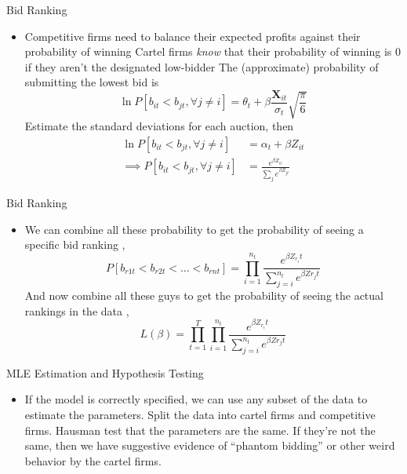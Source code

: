 \documentclass[dvipsnames]{beamer}
\begin{document}
%
\begin{frame}{Bid Ranking}
  \begin{itemize}
  \item Competitive firms need to balance their expected profits against their probability of winning
    \vitem Cartel firms \emph{know} that their probability of winning is $0$ if they aren't the designated low-bidder
    \vitem The (approximate) probability of submitting the lowest bid is
    \[
\ln P[b_{it} < b_{jt}, \forall j \ne i] = \theta_t + \beta \frac{\mathbf{X}_{it}}{\sigma_t} \sqrt{\frac{\pi}{6}} \tag{MNL }
    \]
    \vitem Estimate the standard deviations for each auction, then
    \begin{align*}
      \ln P [b_{it} < b_{jt}, \forall j \ne i] &= \alpha_t + \beta Z_{it}\\
      \implies P [b_{it} < b_{jt}, \forall j \ne i] &= \frac{e^{\beta Z_{it}}}{\sum_je^{\beta Z_{jt}}}
                                           \end{align*}
  \end{itemize}
\end{frame}
%
\begin{frame}{Bid Ranking}
  \begin{itemize}
  \item We can combine all these probability to get the probability of seeing a specific bid ranking ,
    \[
P[b_{r1t} < b_{r2t} < \ldots < b_{rnt}] = \prod^{n_t}_{i = 1} \frac{e^{\beta Z_{r_i}t}}{\sum^{n_t}_{j = i} e^{\beta Z r_j t}}
    \]
    \vitem And now combine all these guys to get the probability of seeing the actual rankings in the data ,
    \[
L(\beta) = \prod^T_{t = 1} \prod^{n_t}_{i = 1} \frac{e^{\beta Z_{r_i}t}}{\sum^{n_t}_{j = i} e^{\beta Z r_j t}}
    \]
  \end{itemize}
\end{frame}
%
\begin{frame}{MLE Estimation and Hypothesis Testing}
  \begin{itemize}
  \item If the model is correctly specified, we can use any subset of the data to estimate the parameters.
    \vitem Split the data into cartel firms and competitive firms.
    \vitem Hausman test that the parameters are the same.
    \vitem If they're not the same, then we have suggestive evidence of ``phantom bidding'' or other weird behavior by the cartel firms.
  \end{itemize}
\end{frame}
\end{document}
